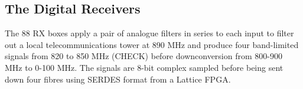 \subsection{The Digital Receivers}
The 88 RX boxes apply a pair of analogue filters in series to each input to filter out a local telecommunications tower at 890 MHz and produce four band-limited signals from 820 to 850 MHz (CHECK) before downconversion from 800-900 MHz to 0-100 MHz. The signals are 8-bit complex sampled before being sent down four fibres using SERDES format from a Lattice FPGA.

  